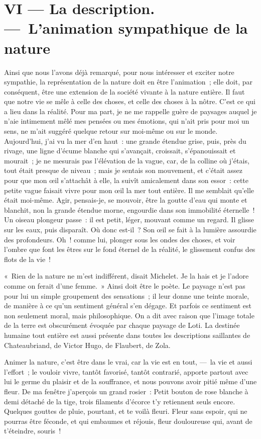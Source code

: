 \documentclass[french,twoside]{book} %
\begin{document}
\section[{VI — La description. — L’animation sympathique de la nature}]{VI — La description. — L’animation sympathique de la nature}
\noindent Ainsi que nous l’avons déjà remarqué, pour nous intéresser et exciter notre sympathie, la représentation de la nature doit en être l’animation ; elle doit, par conséquent, être une extension de la société vivante à la nature entière. Il faut que notre vie se mêle à celle des choses, et celle des choses à la nôtre. C’est ce qui a lieu dans la réalité. Pour ma part, je ne me rappelle guère de paysages auquel je n’aie intimement mêlé mes pensées ou mes émotions, qui n’ait pris pour moi un sens, ne m’ait suggéré quelque retour sur moi-même ou sur le monde. Aujourd’hui, j’ai vu la mer d’en haut : une grande étendue grise, puis, près du rivage, une ligne d’écume blanche qui s’avançait, croissait, s’épanouissait et mourait ; je ne mesurais pas l’élévation de la vague, car, de la colline où j’étais, tout était presque de niveau ; mais je sentais son mouvement, et c’était assez pour que mon œil s’attachât à elle, la suivît amicalement dans son essor : cette petite vague faisait vivre pour mon œil la mer tout entière. Il me semblait qu’elle était moi-même. Agir, pensais-je, se mouvoir, être la goutte d’eau qui monte et blanchit, non la grande étendue morne, engourdie dans son immobilité éternelle ! Un oiseau plongeur passe : il est petit, léger, mouvant comme un regard. Il glisse sur les eaux, puis disparaît. Où donc est-il ? Son œil se fait à la lumière assourdie des profondeurs. Oh ! comme lui, plonger sous les ondes des choses, et voir l’ombre que font les êtres sur le fond éternel de la réalité, le glissement confus des flots de la vie !\par
« Rien de la nature ne m’est indifférent, disait Michelet. Je la hais et je l’adore comme on ferait d’une femme. » Ainsi doit être le poète. Le paysage n’est pas pour lui un simple groupement des sensations ; il leur donne une teinte morale, de manière à ce qu’un sentiment général s’en dégage. Et parfois ce sentiment est non seulement moral, mais philosophique. On a dit avec raison que l’image totale de la terre est obscurément évoquée par chaque paysage de Loti. La destinée humaine tout entière est aussi présente dans toutes les descriptions saillantes de Chateaubriand, de Victor Hugo, de Flaubert, de Zola.\par
Animer la nature, c’est être dans le vrai, car la vie est en tout, — la vie et aussi l’effort ; le vouloir vivre, tantôt favorisé, tantôt contrarié, apporte partout avec lui le germe du plaisir et de la souffrance, et nous pouvons avoir pitié même d’une fleur. De ma fenêtre j’aperçois un grand rosier : Petit bouton de rose blanche à demi détaché de la tige, trois filaments d’écorce t’y retiennent seuls encore. Quelques gouttes de pluie, pourtant, et te voilà fleuri. Fleur sans espoir, qui ne pourras être féconde, et qui embaumes et réjouis, fleur douloureuse qui, avant de t’éteindre, souris !\par
\end{document}
